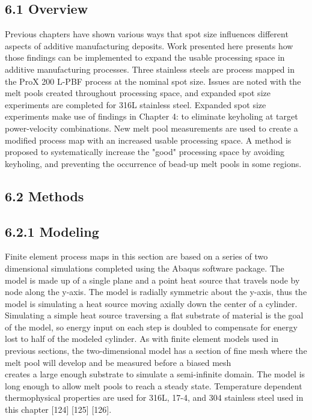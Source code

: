 \documentclass[10pt]{article}
\begin{document}
\subsection*{6.1 Overview}
Previous chapters have shown various ways that spot size influences different aspects of additive manufacturing deposits. Work presented here presents how those findings can be implemented to expand the usable processing space in additive manufacturing processes. Three stainless steels are process mapped in the ProX 200 L-PBF process at the nominal spot size. Issues are noted with the melt pools created throughout processing space, and expanded spot size experiments are completed for 316L stainless steel. Expanded spot size experiments make use of findings in Chapter 4: to eliminate keyholing at target power-velocity combinations. New melt pool measurements are used to create a modified process map with an increased usable processing space. A method is proposed to systematically increase the "good" processing space by avoiding keyholing, and preventing the occurrence of bead-up melt pools in some regions.

\subsection*{6.2 Methods}
\subsection*{6.2.1 Modeling}
Finite element process maps in this section are based on a series of two dimensional simulations completed using the Abaqus software package. The model is made up of a single plane and a point heat source that travels node by node along the y-axis. The model is radially symmetric about the y-axis, thus the model is simulating a heat source moving axially down the center of a cylinder. Simulating a simple heat source traversing a flat substrate of material is the goal of the model, so energy input on each step is doubled to compensate for energy lost to half of the modeled cylinder. As with finite element models used in previous sections, the two-dimensional model has a section of fine mesh where the melt pool will develop and be measured before a biased mesh\\
creates a large enough substrate to simulate a semi-infinite domain. The model is long enough to allow melt pools to reach a steady state. Temperature dependent thermophysical properties are used for 316L, 17-4, and 304 stainless steel used in this chapter [124] [125] [126].
\end{document}
